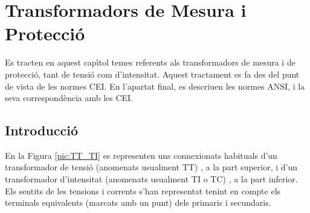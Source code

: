 \chapter{Transformadors de Mesura i Protecci\'{o}}

Es tracten en aquest cap\'{\i}tol temes referents als transformadors de
mesura i de protecci\'{o}, tant de tensi\'{o} com d'intensitat. Aquest
tractament es fa des del punt de vista de les normes \textsf{CEI}.
En l'apartat final, es descriuen les normes \textsf{ANSI}, i la seva
correspond\`{e}ncia amb les \textsf{\textsf{CEI}}.

\section{Introducci\'{o}}

En la Figura \vref{pic:TT_TI} es representen uns connexionats
habituals d'un transformador de tensi\'{o} (anomenats usualment TT) , a
la part superior, i d'un transformador d'intensitat (anomenats
usualment TI o TC) , a la part inferior. Els sentits de les tensions
i corrents s'han representat tenint en compte els terminals
equivalents (marcats amb un punt) dels primaris i secundaris.

